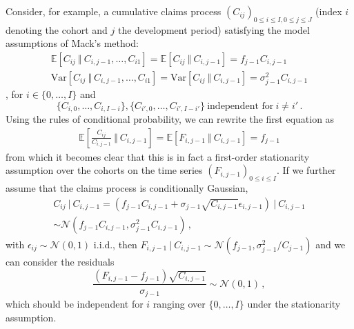 \documentclass[12pt, titlepage]{article}
\begin{document}
Consider, for example, a cumulative claims process $(C_{ij})_{0 \leq i \leq I, 0 \leq j \leq J}$ (index $i$ denoting the cohort and $j$ the development period) satisfying the model assumptions of Mack's method:
\begin{gather}
\mathbb{E}[C_{ij} \ \Vert \ C_{i, j - 1}, \dots, C_{i1}] = \mathbb{E}[C_{ij} \ \Vert \ C_{i, j - 1}] = f_{j - 1} C_{i, j - 1} \\
\mathrm{Var}[C_{ij} \ \Vert \ C_{i, j - 1}, \dots, C_{i1}] = \mathrm{Var}[C_{ij} \ \Vert \ C_{i, j - 1}] = \sigma_{j - 1}^2 C_{i, j - 1}
\end{gather},
for $i \in \{ 0, \dots, I \}$ and
\begin{equation}
\{ C_{i, 0}, \dots, C_{i, I - i} \}, \{ C_{i', 0}, \dots, C_{i', I - i'} \} \ \text{independent for} \ i \neq i' \,.
\end{equation}
Using the rules of conditional probability, we can rewrite the first equation as
\begin{gather}
\mathbb{E}[\frac{C_{ij}}{C_{i, j - 1}} \ \Vert \ C_{i, j - 1}] = \mathbb{E}[F_{i, j - 1} \ \Vert \ C_{i, j - 1}] = f_{j - 1} %
\end{gather}
from which it becomes clear that this is in fact a first-order stationarity assumption over the cohorts on the time series $(F_{i, j - 1})_{0 \leq i \leq I}$. If we further assume that the claims process is conditionally Gaussian, 
\begin{multline}
C_{ij} \ \vert \ C_{i, j - 1} = (f_{j-1}C_{i,j-1} + \sigma_{j-1} \sqrt{C_{i,j-1}} \epsilon_{i, j-1}) \ \vert \ C_{i, j - 1} \\ 
\sim \mathcal{N}(f_{j - 1}C_{i, j - 1}, \sigma_{j - 1}^2 C_{i, j - 1}) \,,
\end{multline}
with $\epsilon_{ij} \sim \mathcal{N}(0, 1)$ i.i.d., then $F_{i, j - 1} \ \vert \ C_{i, j - 1} \sim \mathcal{N}(f_{j - 1}, \sigma_{j - 1}^2/C_{j - 1})$ and we can consider the residuals
\begin{displaymath}
\frac{(F_{i, j - 1} - f_{j - 1})\sqrt{C_{i, j -1}}}{\sigma_{j - 1}} \sim \mathcal{N}(0, 1) \,,
\end{displaymath}
which should be independent for $i$ ranging over $\{0, \dots, I\}$ under the stationarity assumption.
\end{document}
